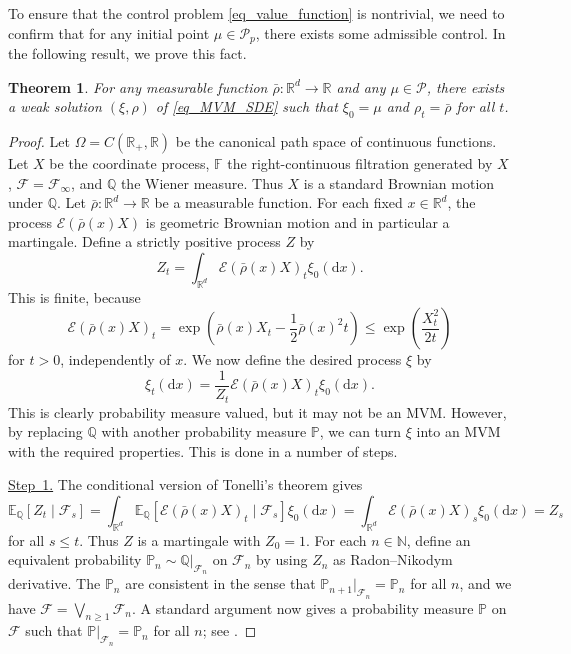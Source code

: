 \documentclass{article}
\newtheorem{theorem}{Theorem}[section]
\theoremstyle{definition}
\numberwithin{equation}{section}
\numberwithin{theorem}{section}
\newcommand{\E}{\mathbb{E}}
\renewcommand{\P}{\mathbb{P}}
\newcommand{\Q}{\mathbb{Q}}
\newcommand{\R}{\mathbb{R}}
\newcommand{\dx}{\mathrm{d}x}
\newcommand{\Fb}{\mathbb{F}}
\newcommand{\Ec}{\mathcal{E}}
\newcommand{\Fc}{\mathcal{F}}
\renewcommand{\P}{{\mathbb P}}
\newcommand{\Pcal}{{\mathcal P}}
\begin{document}
To ensure that the control problem \eqref{eq_value_function} is
nontrivial, we need to confirm that for any initial point
$\mu\in\Pcal_p$, there exists some admissible control. In the following
result, we prove this fact. 

\begin{theorem}\label{thm5}
For any measurable function $\bar\rho\colon {\R^d}\to\R$ and any $\mu\in\Pcal$, there exists a weak solution $(\xi,\rho)$ of \eqref{eq_MVM_SDE} such that $\xi_0=\mu$ and $\rho_t=\bar\rho$ for all $t$.
\end{theorem}



\begin{proof}
Let $\Omega=C(\R_+,\R)$ be the canonical path space of continuous functions. Let $X$ be the coordinate process, $\Fb$ the right-continuous filtration generated by $X$, $\Fc=\Fc_\infty$, and $\Q$ the Wiener measure. Thus $X$ is a standard Brownian motion under $\Q$. Let $\bar\rho\colon {\R^d}\to\R$ be a measurable function. For each fixed $x\in {\R^d}$, the process $\Ec(\bar\rho(x)X)$ is geometric Brownian motion and in particular a martingale. Define a strictly positive process $Z$ by
\[
Z_t = \int_{\R^d} \Ec(\bar\rho(x)X)_t \xi_0(\dx).
\]
This is finite, because
\begin{equation}\label{eq_P_existence_1_new_01}
\Ec(\bar\rho(x)X)_t=\exp\left(\bar\rho(x)X_t-\frac12 \bar\rho(x)^2 t \right) \le \exp\left(\frac{X_t^2}{2t} \right)
\end{equation}
for $t>0$, independently of $x$. We now define the desired process $\xi$ by
\[
\xi_t(\dx) = \frac{1}{Z_t}\Ec(\bar\rho(x)X)_t \xi_0(\dx).
\]
This is clearly probability measure valued, but it may not be an MVM. However, by replacing $\Q$ with another probability measure $\P$, we can turn $\xi$ into an MVM with the required properties. This is done in a number of steps.

\underline{Step~1.}
The conditional version of Tonelli's theorem gives
\[
\E_\Q[Z_t\mid\Fc_s] = \int_{\R^d} \E_\Q[\Ec(\bar\rho(x)X)_t\mid\Fc_s] \xi_0(\dx) = \int_{\R^d}  \Ec(\bar\rho(x)X)_s \xi_0(\dx) = Z_s
\]
for all $s\le t$. Thus $Z$ is a martingale with $Z_0=1$. For each $n\in\mathbb N$, define an equivalent probability $\P_n\sim \Q|_{\Fc_n}$ on $\Fc_n$ by using $Z_n$ as Radon--Nikodym derivative. The $\P_n$ are consistent in the sense that $\P_{n+1}|_{\Fc_n}=\P_n$ for all $n$, and we have $\Fc=\bigvee_{n\ge1}\Fc_n$. A standard argument now gives a probability measure $\P$ on $\Fc$ such that $\P|_{\Fc_n}=\P_n$ for all $n$; see \cite[Section~3.5A]{kar_shr_91}.


\end{proof}
\end{document}
